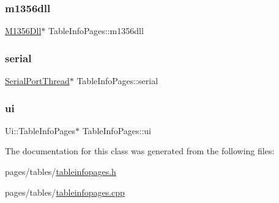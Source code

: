 \mbox{\label{class_table_info_pages_a872072cca279224ba09c34a76c63c404}} 
\subsubsection{\texorpdfstring{m1356dll}{m1356dll}}
{\footnotesize\ttfamily \mbox{\hyperlink{class_m1356_dll}{M1356\+Dll}}$\ast$ Table\+Info\+Pages\+::m1356dll\hspace{0.3cm}{\ttfamily [private]}}

\mbox{\label{class_table_info_pages_a82b9f14a806dec6177ae0242326715b6}} 
\subsubsection{\texorpdfstring{serial}{serial}}
{\footnotesize\ttfamily \mbox{\hyperlink{class_serial_port_thread}{Serial\+Port\+Thread}}$\ast$ Table\+Info\+Pages\+::serial\hspace{0.3cm}{\ttfamily [private]}}

\mbox{\label{class_table_info_pages_a443191ceb391295c9fc39133ceb484a9}} 
\subsubsection{\texorpdfstring{ui}{ui}}
{\footnotesize\ttfamily Ui\+::\+Table\+Info\+Pages$\ast$ Table\+Info\+Pages\+::ui\hspace{0.3cm}{\ttfamily [private]}}



The documentation for this class was generated from the following files\+:\begin{DoxyCompactItemize}
\item 
pages/tables/\mbox{\hyperlink{tableinfopages_8h}{tableinfopages.\+h}}\item 
pages/tables/\mbox{\hyperlink{tableinfopages_8cpp}{tableinfopages.\+cpp}}\end{DoxyCompactItemize}
